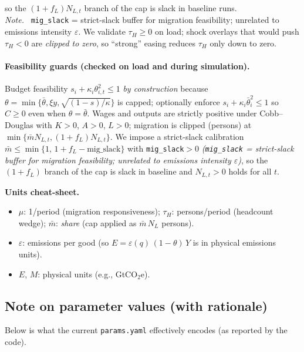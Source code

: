 \documentclass[12pt,a4paper]{article}
\newcommand{\code}[1]{\texttt{#1}}
\begin{document}
\noindent so the \((1+f_L)N_{L,t}\) branch of the cap is slack in baseline runs.\\
\noindent\textit{Note.} \ \texttt{mig\_slack} = strict-slack buffer for migration feasibility; unrelated to emissions intensity \(\varepsilon\).
We validate \(\tau_H\ge 0\) on load; shock overlays that would push \(\tau_H<0\) are \emph{clipped to zero}, so “strong” easing reduces \(\tau_H\) only down to zero.

\paragraph{Feasibility guards (checked on load and during simulation).}
Budget feasibility \(s_i+\kappa_i\theta_{i,t}^2\le 1\) \emph{by construction} because \(\theta=\min\{\bar\theta,\xi y,\sqrt{(1-s)/\kappa}\}\) is capped; optionally enforce \(s_i+\kappa_i\bar\theta_i^2\le 1\) so \(C\ge 0\) even when \(\theta=\bar\theta\).
Wages and outputs are strictly positive under Cobb--Douglas with \(K>0\), \(A>0\), \(L>0\);
migration is clipped (persons) at \(\min\{\bar mN_{L,t},(1+f_L)N_{L,t}\}\). We impose a strict-slack calibration $\bar m \le \min\{1,\, 1+f_L-\text{mig\_slack}\}$ with \texttt{mig\_slack}$>0$ \textit{(\texttt{mig\_slack} = strict-slack buffer for migration feasibility; unrelated to emissions intensity \(\varepsilon\))}, so the $(1+f_L)$ branch of the cap is slack in baseline and $N_{L,t}>0$ holds for all $t$.

\begin{mdframed}[backgroundcolor=gray!08,linewidth=0.5pt]
\textbf{Units cheat-sheet.}
\begin{itemize}[leftmargin=1.25em]
  \item \(\mu\): 1/period (migration responsiveness); \(\tau_H\): persons/period (headcount wedge); \(\bar m\): \emph{share} (cap applied as \(\bar m\,N_L\) persons).
  \item \(\varepsilon\): emissions per good (so \(E=\varepsilon(q)\,(1-\theta)\,Y\) is in physical emissions units).
  \item \(E\), \(M\): physical units (e.g., GtCO\(_2\)e).
\end{itemize}
\end{mdframed}


\subsection*{Note on parameter values (with rationale)}
\begin{mdframed}[backgroundcolor=gray!08,linewidth=0.5pt]
Below is what the current \code{params.yaml} effectively encodes (as reported by the code).
\end{mdframed}
\end{document}
